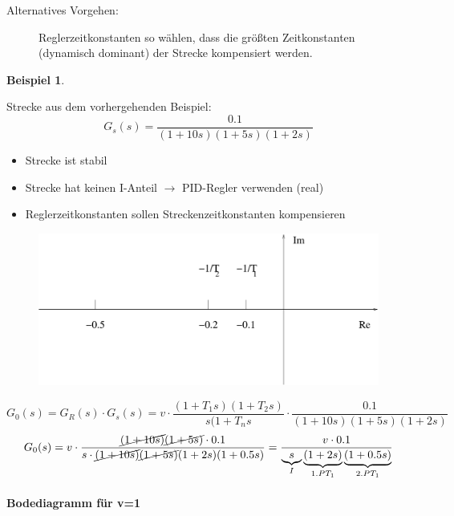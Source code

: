 \documentclass[12pt,a4paper,ngerman]{scrartcl}
\newtheorem{bsp}{Beispiel}[section] %
\begin{document}
\begin{description}
\item[Alternatives Vorgehen:] Reglerzeitkonstanten so wählen, dass die größten Zeitkonstanten (dynamisch dominant) der Strecke kompensiert werden. 
\end{description}
\begin{bsp} 
\end{bsp}
Strecke aus dem vorhergehenden Beispiel:
\[
G_s(s)=\frac{0.1}{(1+10s)(1+5s)(1+2s)}
\]
\begin{itemize}
\item Strecke ist stabil \checkmark
\item Strecke hat keinen I-Anteil $\rightarrow$ PID-Regler verwenden (real)
\item Reglerzeitkonstanten sollen Streckenzeitkonstanten kompensieren
\end{itemize}

\begin{figure}[H]
  \centering
\includegraphics[width=0.7\linewidth]{sysregel_bsp_5_4}  
\end{figure}
\[
G_0(s)=G_R(s)\cdot G_s(s)=v \cdot \frac{(1+T_1s)(1+T_2s)}{s(1+T_ns} \cdot \frac{0.1}{(1+10s)(1+5s)(1+2s)}
\]
\[
G_0(s)=v\cdot \frac{\cancel{(1+10s)}\cancel{(1+5s)}\cdot 0.1}{s\cdot \cancel{(1+10s)}\cancel{(1+5s)}(1+2s)(1+0.5s)}=\frac{v\cdot 0.1}{\underbrace{s}_{I}\underbrace{(1+2s)}_{1. PT_1}\underbrace{(1+0.5s)}_{2. PT_1}}
\]

\paragraph{Bodediagramm für v=1}
\end{document}
